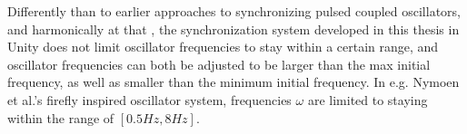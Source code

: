 Differently than to earlier approaches to synchronizing pulsed coupled oscillators, and harmonically at that \cite{nymoen_synch}, the synchronization system developed in this thesis in Unity does not limit oscillator frequencies to stay within a certain range, and oscillator frequencies can both be adjusted to be larger than the max initial frequency, as well as smaller than the minimum initial frequency. In e.g. Nymoen et al.'s firefly inspired oscillator system, frequencies $\omega$ are limited to staying within the range of $[0.5Hz, 8Hz]$.

